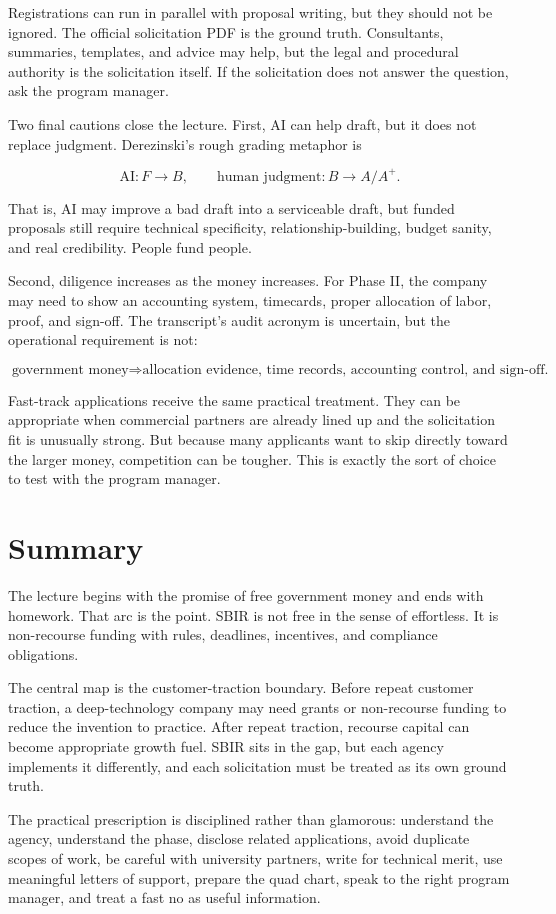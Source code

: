 Registrations can run in parallel with proposal writing, but they should not be ignored. The official solicitation PDF is the ground truth. Consultants, summaries, templates, and advice may help, but the legal and procedural authority is the solicitation itself. If the solicitation does not answer the question, ask the program manager.

Two final cautions close the lecture. First, AI can help draft, but it does not replace judgment. Derezinski's rough grading metaphor is

\begin{equation}
\text{AI}: F\to B,
\qquad
\text{human judgment}: B\to A/A^+.
\end{equation}

That is, AI may improve a bad draft into a serviceable draft, but funded proposals still require technical specificity, relationship-building, budget sanity, and real credibility. People fund people.

Second, diligence increases as the money increases. For Phase II, the company may need to show an accounting system, timecards, proper allocation of labor, proof, and sign-off. The transcript's audit acronym is uncertain, but the operational requirement is not:

\begin{equation}
\text{government money}
\Rightarrow
\text{allocation evidence, time records, accounting control, and sign-off.}
\end{equation}

Fast-track applications receive the same practical treatment. They can be appropriate when commercial partners are already lined up and the solicitation fit is unusually strong. But because many applicants want to skip directly toward the larger money, competition can be tougher. This is exactly the sort of choice to test with the program manager.

\section{Summary}

The lecture begins with the promise of free government money and ends with homework. That arc is the point. SBIR is not free in the sense of effortless. It is non-recourse funding with rules, deadlines, incentives, and compliance obligations.

The central map is the customer-traction boundary. Before repeat customer traction, a deep-technology company may need grants or non-recourse funding to reduce the invention to practice. After repeat traction, recourse capital can become appropriate growth fuel. SBIR sits in the gap, but each agency implements it differently, and each solicitation must be treated as its own ground truth.

The practical prescription is disciplined rather than glamorous: understand the agency, understand the phase, disclose related applications, avoid duplicate scopes of work, be careful with university partners, write for technical merit, use meaningful letters of support, prepare the quad chart, speak to the right program manager, and treat a fast no as useful information.